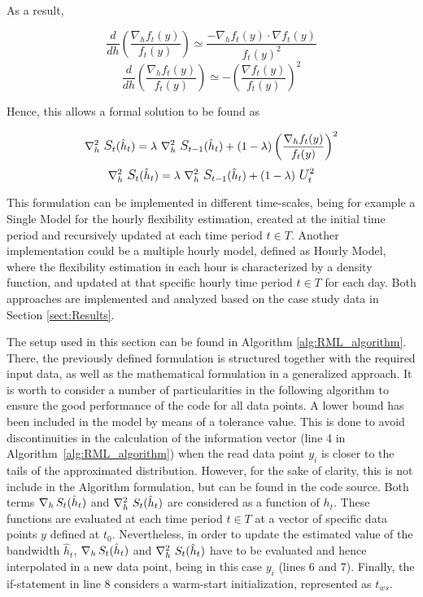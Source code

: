 As a result,

\begin{equation}
\frac{d}{dh} \left(\frac{\nabla_h f_t (y)}{f_t (y)}\right) \simeq  \frac{- \nabla_h f_t (y) \cdot \nabla f_t (y) }{f_t (y) ^2}    
\end{equation}
\begin{equation}
\frac{d}{dh} \left(\frac{\nabla_h f_t (y)}{f_t (y)}\right) \simeq  - \left(\frac{\nabla f_t (y)}{f_t (y)} \right)^2  
\end{equation}

Hence, this allows a formal solution to be found as 

\begin{equation}
    \nabla^2_h \ \mathlarger{S}_t (\hat{h}_{t}) = \lambda \ \nabla^2_h \ \mathlarger{S}_{t-1} (\hat{h}_t) + (1-\lambda) \left(\frac{\nabla_h f_t (y)}{f_t (y)} \right)^2  
\end{equation}
\begin{equation}
     \nabla^2_h \ \mathlarger{S}_t (\hat{h}_{t}) = \lambda \ \nabla^2_h \ \mathlarger{S}_{t-1} (\hat{h}_t) + (1-\lambda) \ \mathlarger{U}_t^2
\end{equation}

This formulation can be implemented in different time-scales, being for example a Single Model for the hourly flexibility estimation, created at the initial time period and recursively updated at each time period $t \in T$. Another implementation could be a multiple hourly model, defined as Hourly Model, where the flexibility estimation in each hour is characterized by a density function, and updated at that specific hourly time period $t \in T$ for each day. Both approaches are implemented and analyzed based on the case study data in Section \ref{sect:Results}.

The setup used in this section can be found in Algorithm \ref{alg:RML_algorithm}. There, the previously defined formulation is structured together with the required input data, as well as the mathematical formulation in a generalized approach. It is worth to consider a number of particularities in the following algorithm to ensure the good performance of the code for all data points. A lower bound has been included in the model by means of a tolerance value.  This is done to avoid discontinuities in the calculation of the information vector (line 4 in Algorithm~\ref{alg:RML_algorithm}) when the read data point $y_{i}$ is closer to the tails of the approximated distribution. However, for the sake of clarity, this is not include in the Algorithm formulation, but can be found in the code source. Both terms $\nabla_h \, \mathlarger{S}_t (\hat{h}_{t})$ and $\nabla^2_h \ \mathlarger{S}_t (\hat{h}_{t})$ are considered as a function of $h_{t}$. These functions are evaluated at each time period $t \in T$ at a vector of specific data points $y$ defined at $t_0$. Nevertheless, in order to update the estimated value of the bandwidth $\hat{h}_t$, $\nabla_h \, \mathlarger{S}_t (\hat{h}_{t})$ and $\nabla^2_h \ \mathlarger{S}_t (\hat{h}_{t})$ have to be evaluated and hence interpolated in a new data point, being in this case $y_i$ (lines 6 and 7). Finally, the if-statement in line 8 considers a warm-start initialization, represented as $t_{ws}$.

